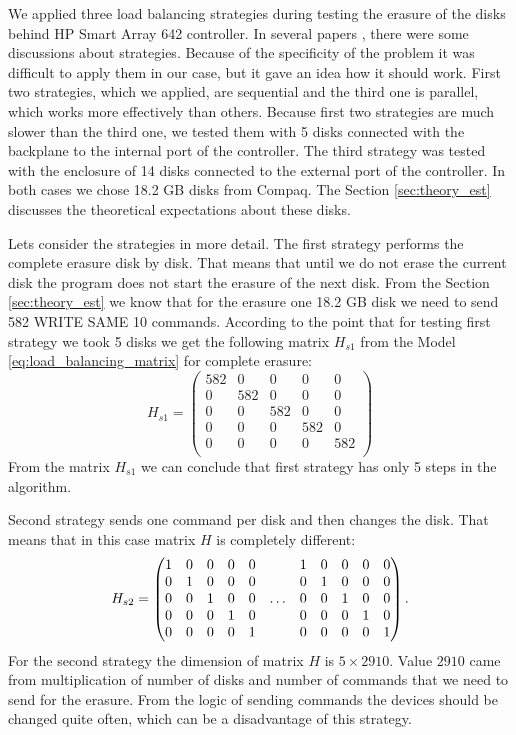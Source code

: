 We applied three load balancing strategies during testing the erasure of the disks behind HP Smart Array 642 controller. In several papers \cite{load_bal_policy}, \cite{diff_policies} there were some discussions about strategies. Because of the specificity of the problem it was difficult to apply them in our case, but it gave an idea how it should work. First two strategies, which we applied, are sequential and the third one is parallel, which works more effectively than others. Because first two strategies are much slower than the third one, we tested them with 5 disks connected with the backplane to the internal port of the controller. The third strategy was tested with the enclosure of 14 disks connected to the external port of the controller. In both cases we chose 18.2 GB disks from Compaq. The Section \ref{sec:theory_est} discusses the theoretical expectations about these disks.

Lets consider the strategies in more detail. The first strategy performs the complete erasure disk by disk. That means that until we do not erase the current disk the program does not start the erasure of the next disk. From the Section \ref{sec:theory_est} we know that for the erasure one 18.2 GB disk we need to send 582 WRITE SAME 10 commands. According to the point that for testing first strategy we took 5 disks we get the following matrix $H_{s1}$ from the Model \ref{eq:load_balancing_matrix} for complete erasure:
\begin{equation}
	H_{s1} =
	\begin{pmatrix}
		582 & 0 & 0 & 0 & 0\\
		0 & 582 & 0 & 0 & 0\\
		0 & 0 & 582 & 0 & 0\\
		0 & 0 & 0 & 582 & 0 \\
		0 & 0 & 0 & 0 & 582 \\
	\end{pmatrix}
\end{equation}
From the matrix $H_{s1}$ we can conclude that first strategy has only 5 steps in the algorithm.


Second strategy sends one command per disk and then changes the disk. That means that in this case
matrix $H$ is completely different:
\begin{equation}
\setcounter{MaxMatrixCols}{13}
	H_{s2} =
	\begin{pmatrix}
		1 & 0 & 0 & 0 & 0 &&  		1 & 0 & 0 & 0 & 0 \\
		0 & 1 & 0 & 0 & 0 &&  		0 & 1 & 0 & 0 & 0 \\
		0 & 0 & 1 & 0 & 0 &\ldots&   0 & 0 & 1 & 0 & 0 \\
		0 & 0 & 0 & 1 & 0 &&  		0 & 0 & 0 & 1 & 0 \\
		0 & 0 & 0 & 0 & 1 &&  		0 & 0 & 0 & 0 & 1 \\
	\end{pmatrix}.
\end{equation}
For the second strategy the dimension of matrix $H$ is $5\times2910$. Value $2910$ came from multiplication of number of disks and number of commands that we need to send for the erasure. From the logic of sending commands the devices should be changed quite often, which can be a disadvantage of this strategy. 


